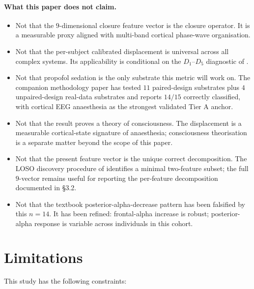 \documentclass[11pt,a4paper]{article}
\begin{document}
\paragraph{What this paper does not claim.}
\begin{itemize}\itemsep0pt
\item Not that the $9$-dimensional closure feature vector is the closure operator. It is a measurable proxy aligned with multi-band cortical phase-wave organisation.
\item Not that the per-subject calibrated displacement is universal across all complex systems. Its applicability is conditional on the $D_1$--$D_5$ diagnostic of \citep{SmartClosureDistance}.
\item Not that propofol sedation is the only substrate this metric will work on. The companion methodology paper has tested $11$ paired-design substrates plus $4$ unpaired-design real-data substrates and reports $14/15$ correctly classified, with cortical EEG anaesthesia as the strongest validated Tier A anchor.
\item Not that the result proves a theory of consciousness. The displacement is a measurable cortical-state signature of anaesthesia; consciousness theorisation is a separate matter beyond the scope of this paper.
\item Not that the present feature vector is the unique correct decomposition. The LOSO discovery procedure of \citep{SmartClosureDistance} identifies a minimal two-feature subset; the full $9$-vector remains useful for reporting the per-feature decomposition documented in §3.2.
\item Not that the textbook posterior-alpha-decrease pattern has been falsified by this $n = 14$. It has been refined: frontal-alpha increase is robust; posterior-alpha response is variable across individuals in this cohort.
\end{itemize}

\section{Limitations}\label{sec:limits}

This study has the following constraints:
\end{document}
